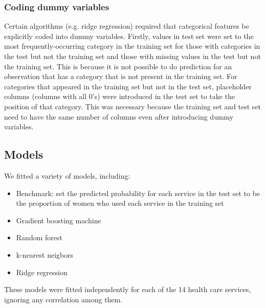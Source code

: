 \documentclass{article}\usepackage[]{graphicx}\usepackage[]{color}
\begin{document}
\subsubsection{Coding dummy variables}
Certain algorithms (e.g. ridge regression) required that categorical features be explicitly coded into dummy variables. Firstly, values in test set were set to the most frequently-occurring category in the training set for those with categories in the test but not the training set and those with missing values in the test but not the training set. This is because it is not possible to do prediction for an observation that has a category that is not present in the training set. For categories that appeared in the training set but not in the test set, placeholder columns (columns with all 0's) were introduced in the test set to take the position of that category. This was necessary because the training set and test set need to have the same number of columns even after introducing dummy variables.

\subsection{Models}
We fitted a variety of models, including:                                                                                                                                                                                                                                                                                                                                                                                                                                                                                                                                                                                                \begin{itemize}
\item Benchmark: set the predicted probability for each service in the test set to be the proportion of women who used each service in the training set
 \item Gradient boosting machine
 \item Random forest
 \item k-nearest neigbors
 \item Ridge regression
 \end{itemize}

These models were fitted independently for each of the 14 health care services, ignoring any correlation among them.
\end{document}
